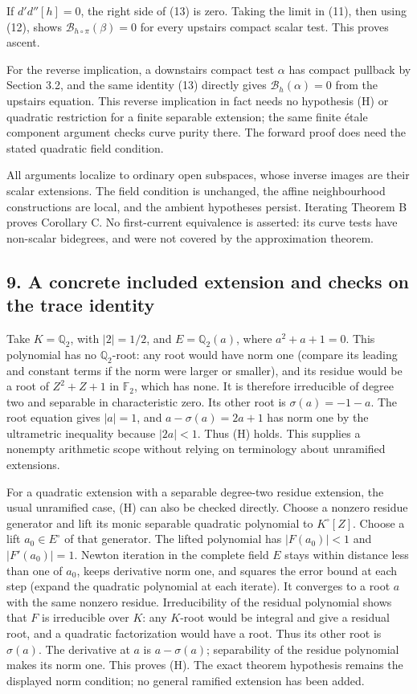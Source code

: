 \documentclass[
  11pt,
]{article}
\begin{document}
If \(d'd''[h]=0\), the right side of (13) is zero. Taking the limit in
(11), then using (12), shows \(\mathcal B_{h\circ\pi}(\beta)=0\) for
every upstairs compact scalar test. This proves ascent.

For the reverse implication, a downstairs compact test \(\alpha\) has
compact pullback by Section 3.2, and the same identity (13) directly
gives \(\mathcal B_h(\alpha)=0\) from the upstairs equation. This
reverse implication in fact needs no hypothesis (H) or quadratic
restriction for a finite separable extension; the same finite étale
component argument checks curve purity there. The forward proof does
need the stated quadratic field condition.

All arguments localize to ordinary open subspaces, whose inverse images
are their scalar extensions. The field condition is unchanged, the
affine neighbourhood constructions are local, and the ambient hypotheses
persist. Iterating Theorem B proves Corollary C. No first-current
equivalence is asserted: its curve tests have non-scalar bidegrees, and
were not covered by the approximation theorem.

\subsection{9. A concrete included extension and checks on the trace
identity}\label{a-concrete-included-extension-and-checks-on-the-trace-identity}

Take \(K=\mathbb Q_2\), with \(|2|=1/2\), and \(E=\mathbb Q_2(a)\),
where \(a^2+a+1=0\). This polynomial has no \(\mathbb Q_2\)-root: any
root would have norm one (compare its leading and constant terms if the
norm were larger or smaller), and its residue would be a root of
\(Z^2+Z+1\) in \(\mathbb F_2\), which has none. It is therefore
irreducible of degree two and separable in characteristic zero. Its
other root is \(\sigma(a)=-1-a\). The root equation gives \(|a|=1\), and
\(a-\sigma(a)=2a+1\) has norm one by the ultrametric inequality because
\(|2a|<1\). Thus (H) holds. This supplies a nonempty arithmetic scope
without relying on terminology about unramified extensions.

For a quadratic extension with a separable degree-two residue extension,
the usual unramified case, (H) can also be checked directly. Choose a
nonzero residue generator and lift its monic separable quadratic
polynomial to \(K^\circ[Z]\). Choose a lift \(a_0\in E^\circ\) of that
generator. The lifted polynomial has \(|F(a_0)|<1\) and \(|F'(a_0)|=1\).
Newton iteration in the complete field \(E\) stays within distance less
than one of \(a_0\), keeps derivative norm one, and squares the error
bound at each step (expand the quadratic polynomial at each iterate). It
converges to a root \(a\) with the same nonzero residue. Irreducibility
of the residual polynomial shows that \(F\) is irreducible over \(K\):
any \(K\)-root would be integral and give a residual root, and a
quadratic factorization would have a root. Thus its other root is
\(\sigma(a)\). The derivative at \(a\) is \(a-\sigma(a)\); separability
of the residue polynomial makes its norm one. This proves (H). The exact
theorem hypothesis remains the displayed norm condition; no general
ramified extension has been added.
\end{document}
